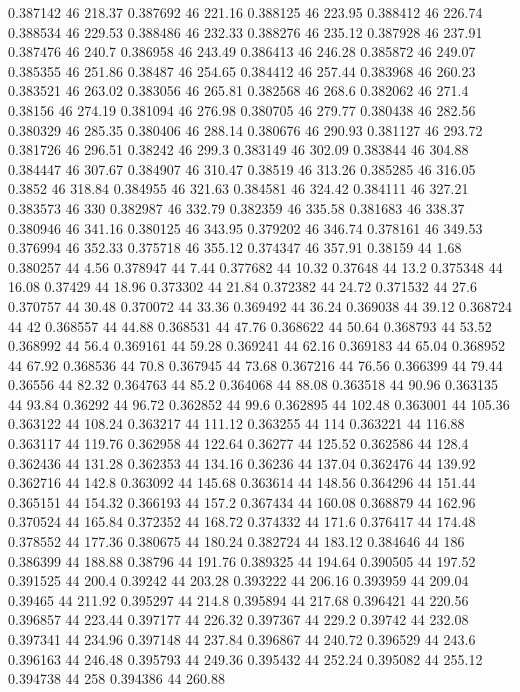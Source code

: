 0.387142 46 218.37
0.387692 46 221.16
0.388125 46 223.95
0.388412 46 226.74
0.388534 46 229.53
0.388486 46 232.33
0.388276 46 235.12
0.387928 46 237.91
0.387476 46 240.7
0.386958 46 243.49
0.386413 46 246.28
0.385872 46 249.07
0.385355 46 251.86
0.38487 46 254.65
0.384412 46 257.44
0.383968 46 260.23
0.383521 46 263.02
0.383056 46 265.81
0.382568 46 268.6
0.382062 46 271.4
0.38156 46 274.19
0.381094 46 276.98
0.380705 46 279.77
0.380438 46 282.56
0.380329 46 285.35
0.380406 46 288.14
0.380676 46 290.93
0.381127 46 293.72
0.381726 46 296.51
0.38242 46 299.3
0.383149 46 302.09
0.383844 46 304.88
0.384447 46 307.67
0.384907 46 310.47
0.38519 46 313.26
0.385285 46 316.05
0.3852 46 318.84
0.384955 46 321.63
0.384581 46 324.42
0.384111 46 327.21
0.383573 46 330
0.382987 46 332.79
0.382359 46 335.58
0.381683 46 338.37
0.380946 46 341.16
0.380125 46 343.95
0.379202 46 346.74
0.378161 46 349.53
0.376994 46 352.33
0.375718 46 355.12
0.374347 46 357.91
0.38159 44 1.68
0.380257 44 4.56
0.378947 44 7.44
0.377682 44 10.32
0.37648 44 13.2
0.375348 44 16.08
0.37429 44 18.96
0.373302 44 21.84
0.372382 44 24.72
0.371532 44 27.6
0.370757 44 30.48
0.370072 44 33.36
0.369492 44 36.24
0.369038 44 39.12
0.368724 44 42
0.368557 44 44.88
0.368531 44 47.76
0.368622 44 50.64
0.368793 44 53.52
0.368992 44 56.4
0.369161 44 59.28
0.369241 44 62.16
0.369183 44 65.04
0.368952 44 67.92
0.368536 44 70.8
0.367945 44 73.68
0.367216 44 76.56
0.366399 44 79.44
0.36556 44 82.32
0.364763 44 85.2
0.364068 44 88.08
0.363518 44 90.96
0.363135 44 93.84
0.36292 44 96.72
0.362852 44 99.6
0.362895 44 102.48
0.363001 44 105.36
0.363122 44 108.24
0.363217 44 111.12
0.363255 44 114
0.363221 44 116.88
0.363117 44 119.76
0.362958 44 122.64
0.36277 44 125.52
0.362586 44 128.4
0.362436 44 131.28
0.362353 44 134.16
0.36236 44 137.04
0.362476 44 139.92
0.362716 44 142.8
0.363092 44 145.68
0.363614 44 148.56
0.364296 44 151.44
0.365151 44 154.32
0.366193 44 157.2
0.367434 44 160.08
0.368879 44 162.96
0.370524 44 165.84
0.372352 44 168.72
0.374332 44 171.6
0.376417 44 174.48
0.378552 44 177.36
0.380675 44 180.24
0.382724 44 183.12
0.384646 44 186
0.386399 44 188.88
0.38796 44 191.76
0.389325 44 194.64
0.390505 44 197.52
0.391525 44 200.4
0.39242 44 203.28
0.393222 44 206.16
0.393959 44 209.04
0.39465 44 211.92
0.395297 44 214.8
0.395894 44 217.68
0.396421 44 220.56
0.396857 44 223.44
0.397177 44 226.32
0.397367 44 229.2
0.39742 44 232.08
0.397341 44 234.96
0.397148 44 237.84
0.396867 44 240.72
0.396529 44 243.6
0.396163 44 246.48
0.395793 44 249.36
0.395432 44 252.24
0.395082 44 255.12
0.394738 44 258
0.394386 44 260.88
